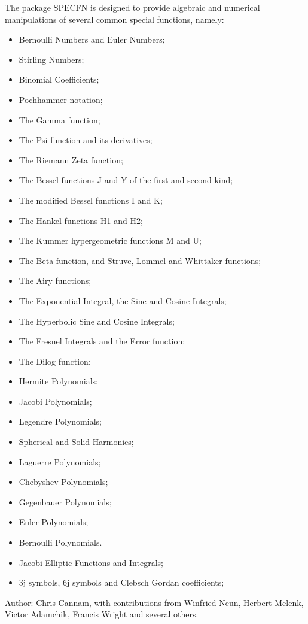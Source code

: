 The package SPECFN is designed to provide algebraic and numerical
manipulations of several common special functions, namely:

\begin{itemize}
\item Bernoulli Numbers and Euler Numbers;
\item Stirling Numbers;
\item Binomial Coefficients;
\item Pochhammer notation;
\item The Gamma function;
\item The Psi function and its derivatives;
\item The Riemann Zeta function;
\item The Bessel functions J and Y of the first and second kind;
\item The modified Bessel functions I and K;
\item The Hankel functions H1 and H2;
\item The Kummer hypergeometric functions M and U;
\item The Beta function, and Struve, Lommel and Whittaker functions;
\item The Airy functions;
\item The Exponential Integral, the Sine and Cosine Integrals;
\item The Hyperbolic Sine and Cosine Integrals;
\item The Fresnel Integrals and the Error function;
\item The Dilog function;
\item Hermite Polynomials;
\item Jacobi Polynomials;
\item Legendre Polynomials;
\item Spherical and Solid Harmonics;
\item Laguerre Polynomials;
\item Chebyshev Polynomials;
\item Gegenbauer Polynomials;
\item Euler  Polynomials;
\item Bernoulli Polynomials.
\item Jacobi Elliptic Functions and Integrals;
\item 3j symbols, 6j symbols and Clebsch Gordan coefficients;
\end{itemize}

Author:  Chris Cannam, with contributions from Winfried Neun, Herbert
Melenk, Victor Adamchik, Francis Wright and several others.

